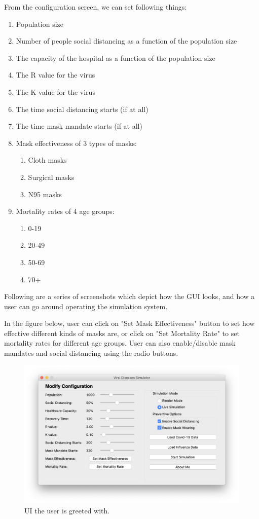 \documentclass[11pt]{article}
\begin{document}
From the configuration screen, we can set following things:
\begin{enumerate}
    \item Population size
    \item Number of people social distancing as a function of the population size
    \item The capacity of the hospital as a function of the population size
    \item The R value for the virus
    \item The K value for the virus
    \item The time social distancing starts (if at all)
    \item The time mask mandate starts (if at all)
    \item Mask effectiveness of 3 types of masks:
    \begin{enumerate}
        \item Cloth masks
        \item Surgical masks
        \item N95 masks
    \end{enumerate}
    \item Mortality rates of 4 age groups:
        \begin{enumerate}
            \item 0-19
            \item 20-49
            \item 50-69
            \item 70+
        \end{enumerate}
\end{enumerate}

Following are a series of screenshots which depict how the GUI looks, and how a user can go around operating the simulation system.

In the figure below, user can click on "Set Mask Effectiveness" button to set how effective different kinds of masks are, or click on "Set Mortality Rate" to set mortality rates for different age groups. User can also enable/disable mask mandates and social distancing using the radio buttons. 

\begin{figure}[H]
    \centering
    \includegraphics[width=14cm]{figures/ui-vis.png}
    \caption{UI the user is greeted with.}
    \label{fig:main_ui}
\end{figure}
\end{document}

